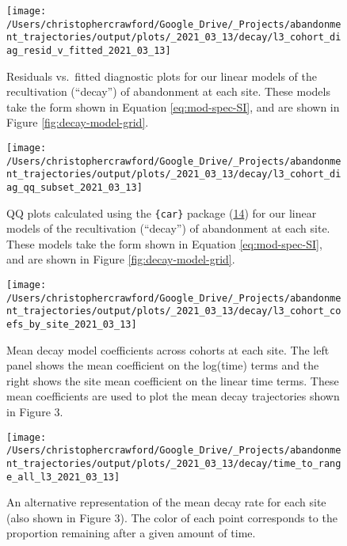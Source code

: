 \documentclass[9pt,lineno]{pnas-new}
\begin{document}
\begin{figure}
\texttt{[image: /Users/christophercrawford/Google\_Drive/\_Projects/abandonment\_trajectories/output/plots/\_2021\_03\_13/decay/l3\_cohort\_diag\_resid\_v\_fitted\_2021\_03\_13]} \caption{Residuals vs.~fitted diagnostic plots for our linear models of the recultivation (``decay'') of abandonment at each site. These models take the form shown in Equation \eqref{eq:mod-spec-SI}, and are shown in Figure \ref{fig:decay-model-grid}.}\label{fig:diag-resid-fitted}
\end{figure}



\begin{figure}
\texttt{[image: /Users/christophercrawford/Google\_Drive/\_Projects/abandonment\_trajectories/output/plots/\_2021\_03\_13/decay/l3\_cohort\_diag\_qq\_subset\_2021\_03\_13]} \caption{QQ plots calculated using the \texttt{\{car\}} package (\protect\hyperlink{ref-R-car}{14}) for our linear models of the recultivation (``decay'') of abandonment at each site. These models take the form shown in Equation \eqref{eq:mod-spec-SI}, and are shown in Figure \ref{fig:decay-model-grid}.}\label{fig:diag-qq}
\end{figure}



\begin{figure}
\texttt{[image: /Users/christophercrawford/Google\_Drive/\_Projects/abandonment\_trajectories/output/plots/\_2021\_03\_13/decay/l3\_cohort\_coefs\_by\_site\_2021\_03\_13]} \caption{Mean decay model coefficients across cohorts at each site. The left panel shows the mean coefficient on the log(time) terms and the right shows the site mean coefficient on the linear time terms. These mean coefficients are used to plot the mean decay trajectories shown in Figure 3.}\label{fig:decay-mod-coef}
\end{figure}



\begin{figure}
\texttt{[image: /Users/christophercrawford/Google\_Drive/\_Projects/abandonment\_trajectories/output/plots/\_2021\_03\_13/decay/time\_to\_range\_all\_l3\_2021\_03\_13]} \caption{An alternative representation of the mean decay rate for each site (also shown in Figure 3). The color of each point corresponds to the proportion remaining after a given amount of time.}\label{fig:decay-time-to-range}
\end{figure}
\end{document}

